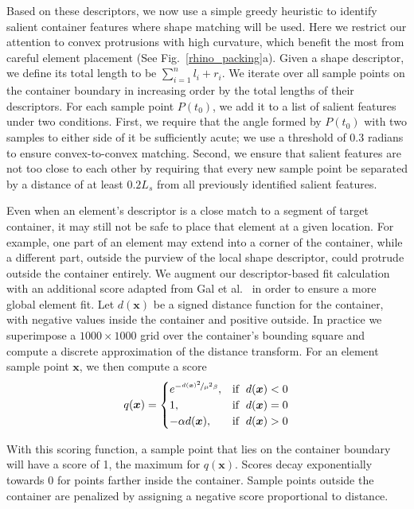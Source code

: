 \newtext
{
Based on these descriptors, we now use a simple greedy heuristic to identify salient container features where shape matching will be used.
Here we restrict our attention to convex protrusions with high curvature, which benefit the most from careful element placement (See Fig.~\ref{rhino_packing}a).  Given a shape descriptor, we define its total length to be $\sum_{i=1}^nl_i+r_i$.  We iterate over all sample points on the container boundary in increasing order by the total lengths of their descriptors.  For each sample point $P(t_0)$, we add it to a list of salient features under two conditions. First, we require that the angle formed by $P(t_0)$ with two samples to either side of it be sufficiently acute; we use a threshold of 0.3 radians to ensure convex-to-convex matching.
Second, we ensure that salient features are not too close to each other by requiring that every new sample point be separated by a distance of at least $0.2L_s$ from all previously identified salient features.
}


\newtext
{
Even when an element's descriptor is a close match to a segment of 
target container, 
it may still not be safe to place that element at a given location.
For example, one part of an element may extend into a corner of the container,
while a different part, outside the purview of the local shape descriptor,
could protrude outside the container entirely.  We augment our 
descriptor-based fit calculation with an additional score adapted from
Gal et al.~\cite{Gal2007B} in order to ensure a more global element fit.
Let $d(\bm{x})$ be a signed distance function for the container, with
negative values inside the container and positive outside.  In practice we
superimpose a $1000\times 1000$ grid over the container's bounding square and
compute a discrete approximation of the distance transform.  For an element
sample point $\bm{x}$, we then compute a score
\begin{equation}
 q(\bm{x}) =\begin{cases}    
    e^{-\nicefrac{d(\bm{x})^2}{\mu^2\beta}}, & \mathrm{if} \;\; d(\bm{x}) < 0 \\
    1, & \mathrm{if} \;\;d(\bm{x}) = 0 \\
    - \alpha d(\bm{x}), & \mathrm{if}\;\; d(\bm{x}) > 0    
  \end{cases}
\end{equation}
}

With this scoring function, a sample point that lies on the container boundary
will have a score of 1, the maximum for $q(\bm{x})$.
Scores decay exponentially towards 0
for points farther inside the container.  Sample points outside the container
are penalized by assigning a negative score proportional to distance.

